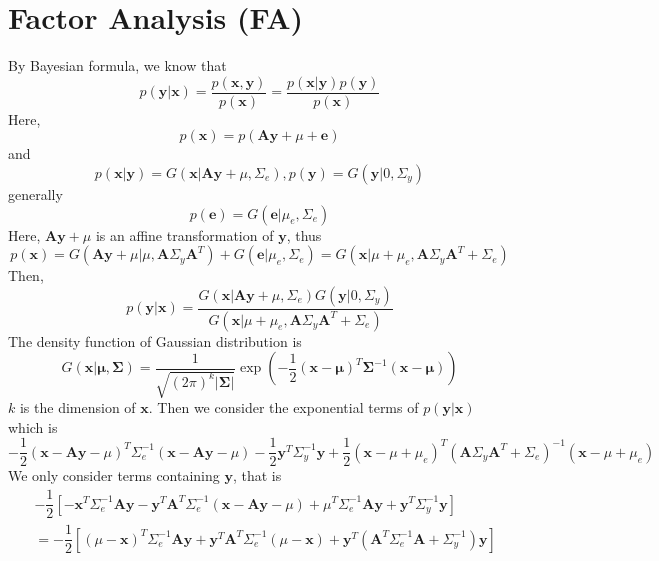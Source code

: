 \documentclass{article}
\begin{document}
\section{Factor Analysis (FA)}
By Bayesian formula, we know that
\begin{equation}
  p(\mathbf{y}|\mathbf{x})=\dfrac{p(\mathbf{x},\mathbf{y})}{p(\mathbf{x})}=\dfrac{p(\mathbf{x}|\mathbf{y})p(\mathbf{y})}{p(\mathbf{x})}
\end{equation}
Here, 
\begin{equation}
  p(\mathbf{x})=p(\mathbf{Ay}+\mu+\mathbf{e})
\end{equation}
and
\begin{equation}
  p(\mathbf{x}|\mathbf{y})=G(\mathbf{x}|\mathbf{Ay}+\mu,\Sigma_e),p(\mathbf{y})=G(\mathbf{y}|0,\Sigma_y)
\end{equation}
generally 
\begin{equation}
  p(\mathbf{e})=G(\mathbf{e}|\mu_e,\Sigma_e)  
\end{equation}
Here, $\mathbf{Ay}+\mu$ is an affine transformation of $\mathbf{y}$, thus 
\begin{equation}
  p(\mathbf{x})=G(\mathbf{Ay}+\mu|\mu, \mathbf{A}\Sigma_y\mathbf{A}^T)+G(\mathbf{e}|\mu_e,\Sigma_e)=G(\mathbf{x}|\mu+\mu_e, \mathbf{A}\Sigma_y\mathbf{A}^T+\Sigma_e)  
\end{equation}
Then, 
\begin{equation}
  p(\mathbf{y}|\mathbf{x})=\dfrac{G(\mathbf{x}|\mathbf{Ay}+\mu,\Sigma_e)G(\mathbf{y}|0,\Sigma_y)}{G(\mathbf{x}|\mu+\mu_e, \mathbf{A}\Sigma_y\mathbf{A}^T+\Sigma_e)}  
\end{equation}
The density function of Gaussian distribution is 
\begin{equation}
  G(\mathbf{x}|\mathbf{\mu},\mathbf{\Sigma})=\dfrac{1}{\sqrt{(2\pi)^k|\mathbf{\Sigma}|}}\exp(-\dfrac{1}{2}(\mathbf{x}-\mathbf{\mu})^T\mathbf{\Sigma}^{-1}(\mathbf{x}-\mathbf{\mu}))  
\end{equation}
$k$ is the dimension of $\mathbf{x}$.
Then we consider the exponential terms of $p(\mathbf{y}|\mathbf{x})$ which is
\begin{equation}
  -\dfrac{1}{2}(\mathbf{x}-\mathbf{Ay}-\mu)^T\Sigma_e^{-1}(\mathbf{x}-\mathbf{Ay}-\mu)-\dfrac{1}{2}\mathbf{y}^T\Sigma_y^{-1}\mathbf{y}+\dfrac{1}{2}(\mathbf{x}-\mu+\mu_e)^T(\mathbf{A}\Sigma_y\mathbf{A}^T+\Sigma_e)^{-1}(\mathbf{x}-\mu+\mu_e)  
\end{equation}
We only consider terms containing $\mathbf{y}$, that is
\begin{equation}
  \label{eq1}
  \begin{split}
    &-\dfrac{1}{2}[-\mathbf{x}^T\Sigma_e^{-1}\mathbf{Ay}-\mathbf{y}^T\mathbf{A}^T\Sigma_e^{-1}(\mathbf{x}-\mathbf{Ay}-\mu)+\mu^T\Sigma_e^{-1}\mathbf{Ay}+\mathbf{y}^T\Sigma_y^{-1}\mathbf{y}]\\
    &=-\dfrac{1}{2}[(\mu-\mathbf{x})^T\Sigma_e^{-1}\mathbf{Ay}+\mathbf{y}^T\mathbf{A}^T\Sigma_e^{-1}(\mu-\mathbf{x})+\mathbf{y}^T(\mathbf{A}^T\Sigma_e^{-1}\mathbf{A}+\Sigma_y^{-1})\mathbf{y}]
  \end{split}
\end{equation}
\end{document}
